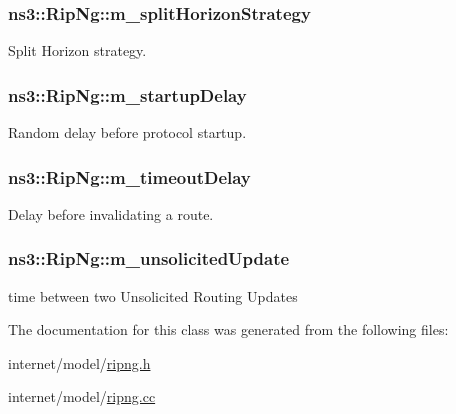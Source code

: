 \subsubsection[{\texorpdfstring{m\+\_\+split\+Horizon\+Strategy}{m_splitHorizonStrategy}}]{ ns3\+::\+Rip\+Ng\+::m\+\_\+split\+Horizon\+Strategy\hspace{0.3cm}{\ttfamily [private]}}\hypertarget{classns3_1_1RipNg_a2aaaf4747380a0960cc48cb04ae99a1a}{}\label{classns3_1_1RipNg_a2aaaf4747380a0960cc48cb04ae99a1a}


Split Horizon strategy. 

\subsubsection[{\texorpdfstring{m\+\_\+startup\+Delay}{m_startupDelay}}]{ ns3\+::\+Rip\+Ng\+::m\+\_\+startup\+Delay\hspace{0.3cm}{\ttfamily [private]}}\hypertarget{classns3_1_1RipNg_a11c536612cb48e139d4a3b8d34c9ec3a}{}\label{classns3_1_1RipNg_a11c536612cb48e139d4a3b8d34c9ec3a}


Random delay before protocol startup. 

\subsubsection[{\texorpdfstring{m\+\_\+timeout\+Delay}{m_timeoutDelay}}]{ ns3\+::\+Rip\+Ng\+::m\+\_\+timeout\+Delay\hspace{0.3cm}{\ttfamily [private]}}\hypertarget{classns3_1_1RipNg_aed45845b278332b589e76304a3701d72}{}\label{classns3_1_1RipNg_aed45845b278332b589e76304a3701d72}


Delay before invalidating a route. 

\subsubsection[{\texorpdfstring{m\+\_\+unsolicited\+Update}{m_unsolicitedUpdate}}]{ ns3\+::\+Rip\+Ng\+::m\+\_\+unsolicited\+Update\hspace{0.3cm}{\ttfamily [private]}}\hypertarget{classns3_1_1RipNg_a8bedf450622f395cc52c1d37dc4d7a40}{}\label{classns3_1_1RipNg_a8bedf450622f395cc52c1d37dc4d7a40}


time between two Unsolicited Routing Updates 



The documentation for this class was generated from the following files\+:\begin{DoxyCompactItemize}
\item 
internet/model/\hyperlink{ripng_8h}{ripng.\+h}\item 
internet/model/\hyperlink{ripng_8cc}{ripng.\+cc}\end{DoxyCompactItemize}
